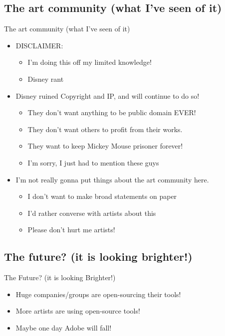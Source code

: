 \documentclass[xcolor=svgnames,handout]{beamer}
\begin{document}
\subsection{The art community (what I've seen of it)}

\begin{frame}
	{The art community (what I've seen of it)}

	\begin{itemize}
		\item DISCLAIMER\@:
			\begin{itemize}
				\item I'm doing this off my limited knowledge!
				\item Disney rant
			\end{itemize}
		\item Disney ruined Copyright and IP, and will continue to do so!
			\begin{itemize}
				\item They don't want anything to be public domain EVER\@!
				\item They don't want others to profit from their works.
				\item They want to keep Mickey Mouse prisoner forever!
				\item I'm sorry, I just had to mention these guys
			\end{itemize}
		\item I'm not really gonna put things about the art community here.
			\begin{itemize}
				\item I don't want to make broad statements on paper
				\item I'd rather converse with artists about this
				\item Please don't hurt me artists!
			\end{itemize}
	\end{itemize}

\end{frame}

\subsection{The future? (it is looking brighter!)}

\begin{frame}
	{The Future? (it is looking Brighter!)}

	\begin{itemize}
		\item Huge companies/groups are open-sourcing their tools!
		\item More artists are using open-source tools!
		\item Maybe one day Adobe will fall!

	\end{itemize}


\end{frame}
\end{document}
